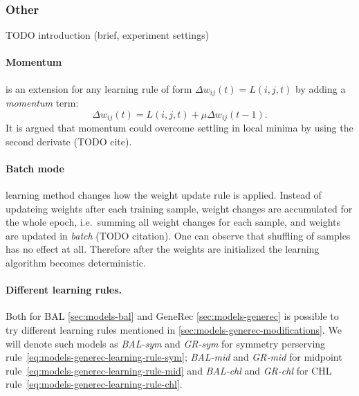 \subsubsection{Other}
TODO introduction (brief, experiment settings) 

\paragraph{Momentum}
\label{sec:our-momentum}

\citep{rumelhart1986learning, yu1997efficient} is an extension for any learning rule of form $\Delta w_{ij}(t) = L(i,j,t)$ by adding a \emph{momentum} term: 
\begin{equation} 
  \Delta w_{ij}(t) = L(i,j,t) + \mu \Delta w_{ij}(t-1).
\end{equation} 
It is argued that momentum could overcome settling in local minima by using the second derivate (TODO cite). 

\paragraph{Batch mode} learning method changes how the weight update rule is applied. Instead of updateing weights after each training sample, weight changes are accumulated for the whole epoch, i.e.~summing all weight changes for each sample, and weights are updated in \emph{batch} (TODO citation). One can observe that shuffling of samples has no effect at all. Therefore after the weights are initialized the learning algorithm becomes deterministic.

\paragraph{Different learning rules.}
\label{sec:our-learning-rules}

Both for BAL \ref{sec:models-bal} and GeneRec \ref{sec:models-generec} is possible to try different learning rules mentioned in \ref{sec:models-generec-modifications}. We will denote such models as \emph{BAL-sym} and \emph{GR-sym} for symmetry perserving rule~\ref{eq:models-generec-learning-rule-sym}; \emph{BAL-mid} and \emph{GR-mid} for midpoint rule~\ref{eq:models-generec-learning-rule-mid} and \emph{BAL-chl} and \emph{GR-chl} for CHL rule~\ref{eq:models-generec-learning-rule-chl}. 

